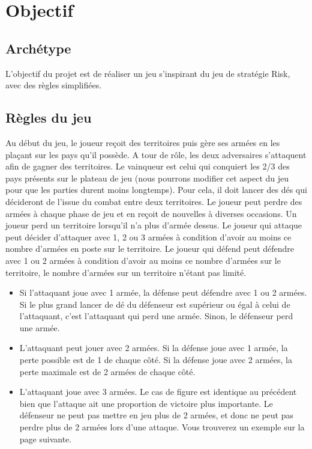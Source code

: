 \section{Objectif}

\subsection{Archétype}
    L'objectif du projet est de réaliser un jeu s'inspirant du jeu de stratégie Risk, avec des règles simplifiées.
    
\subsection{Règles du jeu}
    Au début du jeu, le joueur reçoit des territoires puis gère ses armées en les plaçant sur les pays qu'il possède. A tour de rôle, les deux adversaires s'attaquent afin de gagner des territoires. Le vainqueur est celui qui conquiert les 2/3 des pays présents sur le plateau de jeu (nous pourrons modifier cet aspect du jeu pour que les parties durent moins longtemps). Pour cela, il doit lancer des dés qui décideront de l'issue du combat entre deux territoires. Le joueur peut perdre des armées à chaque phase de jeu et en reçoit de nouvelles à diverses occasions. Un joueur perd un territoire lorsqu'il n'a plus d'armée dessus. 
    \newline
    \newline
    Le joueur qui attaque peut décider d'attaquer avec 1, 2 ou 3 armées à condition d'avoir au moins ce nombre d'armées en poste sur le territoire. Le joueur qui défend peut défendre avec 1 ou 2 armées à condition d'avoir au moins ce nombre d'armées sur le territoire, le nombre d'armées sur un territoire n'étant pas limité.
    \begin{itemize}
        \item Si l'attaquant joue avec 1 armée, la défense peut défendre avec 1 ou 2 armées. Si le plus grand lancer de dé du défenseur est supérieur ou égal à celui de l'attaquant, c'est l'attaquant qui perd une armée. Sinon, le défenseur perd une armée. 
        \item L'attaquant peut jouer avec 2 armées. Si la défense joue avec 1 armée, la perte possible est de 1 de chaque côté. Si la défense joue avec 2 armées, la perte maximale est de 2 armées de chaque côté. 
        \item L'attaquant joue avec 3 armées. Le cas de figure est identique au précédent bien que l'attaque ait une proportion de victoire plus importante. Le défenseur ne peut pas mettre en jeu plus de 2 armées, et donc ne peut pas perdre plus de 2 armées lors d'une attaque. Vous trouverez un exemple sur la page suivante. 
        \newline
        \newline
    \end{itemize}


